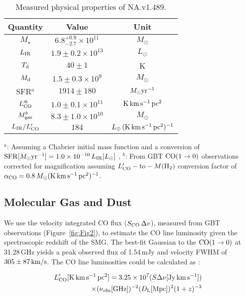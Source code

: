 \documentclass[iop,apj,useAMS,usenatbib]{emulateapj-rtx4}
\begin{document}
\begin{table}
\begin{center}
\caption{Measured physical properties of NA.v1.489.}
\begin{tabular}{ccc}
\hline
\hline
Quantity & Value & Unit \\ 
\hline
$M_{\star}$ & $6.8_{-2.7}^{+0.9}\times10^{11}$ & $M_{\odot}$ \\
$L_{\rm IR}$ & $1.9\pm0.2\times10^{13}$ & $L_{\odot}$ \\
$T_{\rm d}$ & $40\pm1$ & K\\
$M_{\rm d}$ & $1.5\pm0.3\times10^9$ & $M_{\odot}$\\
SFR$^a$ & $1914\pm180$ & $M_{\odot}{\rm yr^{-1}}$ \\
$L^{\prime b}_{\rm CO}$ & $1.0\pm0.1\times10^{11}$ & ${\rm K\,km\,s^{-1}\,pc^2}$ \\
$M^{b}_{\rm gas}$ & $8.3\pm1.0\times10^{10}$ & $M_{\odot}$\\
$L_{\rm IR}/L^{\prime}_{\rm CO}$ & $184$ & $L_{\odot}\,{\rm (K\,km\,s^{-1}\,pc^2)^{-1}}$\\
\hline
\end{tabular}
\end{center}
\footnotesize
$^a$: Assuming a Chabrier initial mass function and a conversion of
${\rm SFR}[M_{\odot}{\rm yr^{-1}}]=1.0\times10^{-10}\,L_{\rm
  IR}[L_{\odot}]$ \citep{Riechers2013}, $^b$: From GBT ${\rm
  CO(1\rightarrow0)}$ observations corrected for magnification
assuming $L_{\rm CO}^{\prime}-{\rm to}-M({\rm H_2})$ conversion factor
of $\alpha_{\rm CO} = 0.8\,M_{\odot}{\rm (K\,km\,s^{-1}\,pc^2)^{-1}}$. 
\end{table}

\subsection{Molecular Gas and Dust}

We use the velocity integrated CO flux ($S_{\rm CO}\,\Delta v$), measured from GBT
observations (Figure~\ref{fig:Fig2}), to estimate the CO line luminosity given the
spectroscopic redshift of the SMG. The best-fit Gaussian to the $\rm
{CO (1 \rightarrow 0)}$ at 31.28\,GHz yields a peak observed flux of 1.54\,mJy and
velocity FWHM of $305\pm87\,{\rm km/s}$. The CO line luminosities could be
calculated as \citep{Solomon2005, Ivison2011, Bolatto2013, Carilli2013, Scoville2016}:

\begin{equation}
\begin{split}
L_{\rm CO}^{\prime}[{\rm
  K\,km\,s^{-1}\,pc^2}]=3.25\times10^7(S\Delta\nu [{\rm
  Jy\,km\,s^{-1}}])\\
\times(\nu_{\rm obs}[{\rm GHz}])^{-2}(D_{\rm L} [{\rm Mpc}])^2(1+z)^{-3}
\end{split}
\end{equation}
\end{document}
